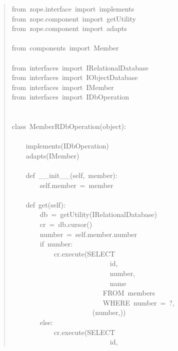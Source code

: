 \documentclass[14pt,a4paper,openany,twoside,final]{extbook}
\begin{document}
\begin{quote}{\ttfamily \raggedright \noindent
from~zope.interface~import~implements\\
from~zope.component~import~getUtility\\
from~zope.component~import~adapts\\
~\\
from~components~import~Member\\
~\\
from~interfaces~import~IRelationalDatabase\\
from~interfaces~import~IObjectDatabase\\
from~interfaces~import~IMember\\
from~interfaces~import~IDbOperation\\
~\\
~\\
class~MemberRDbOperation(object):\\
~\\
~~~~implements(IDbOperation)\\
~~~~adapts(IMember)\\
~\\
~~~~def~\_\_init\_\_(self,~member):\\
~~~~~~~~self.member~=~member\\
~\\
~~~~def~get(self):\\
~~~~~~~~db~=~getUtility(IRelationalDatabase)\\
~~~~~~~~cr~=~db.cursor()\\
~~~~~~~~number~=~self.member.number\\
~~~~~~~~if~number:\\
~~~~~~~~~~~~cr.execute(\textquotedbl{}\textquotedbl{}\textquotedbl{}SELECT\\
~~~~~~~~~~~~~~~~~~~~~~~~~~~~id,\\
~~~~~~~~~~~~~~~~~~~~~~~~~~~~number,\\
~~~~~~~~~~~~~~~~~~~~~~~~~~~~name\\
~~~~~~~~~~~~~~~~~~~~~~~~~~FROM~members\\
~~~~~~~~~~~~~~~~~~~~~~~~~~WHERE~number~=~?\textquotedbl{}\textquotedbl{}\textquotedbl{},\\
~~~~~~~~~~~~~~~~~~~~~~~(number,))\\
~~~~~~~~else:\\
~~~~~~~~~~~~cr.execute(\textquotedbl{}\textquotedbl{}\textquotedbl{}SELECT\\
~~~~~~~~~~~~~~~~~~~~~~~~~~~~id,\\
}
\end{quote}
\end{document}
